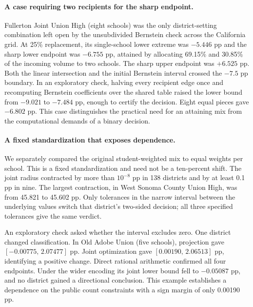 \documentclass[11pt]{article}
\begin{document}
\paragraph{A case requiring two recipients for the sharp endpoint.}
Fullerton Joint Union High (eight schools) was the only district-setting combination left open by the unsubdivided Bernstein check across the California grid. At 25\% replacement, its single-school lower extreme was $-5.446$ pp and the sharp lower endpoint was $-6.755$ pp, attained by allocating 69.15\% and 30.85\% of the incoming volume to two schools. The sharp upper endpoint was $+6.525$ pp. Both the linear intersection and the initial Bernstein interval crossed the $-7.5$ pp boundary. In an exploratory check, halving every recipient edge once and recomputing Bernstein coefficients over the shared table raised the lower bound from $-9.021$ to $-7.484$ pp, enough to certify the decision. Eight equal pieces gave $-6.802$ pp. This case distinguishes the practical need for an attaining mix from the computational demands of a binary decision.

\paragraph{A fixed standardization that exposes dependence.}
We separately compared the original student-weighted mix to equal weights per school. This is a fixed standardization and need not be a ten-percent shift. The joint radius contracted by more than $10^{-8}$ pp in 138 districts and by at least 0.1 pp in nine. The largest contraction, in West Sonoma County Union High, was from 45.821 to 45.602 pp. Only tolerances in the narrow interval between the underlying values switch that district's two-sided decision; all three specified tolerances give the same verdict.

An exploratory check asked whether the interval excludes zero. One district changed classification. In Old Adobe Union (five schools), projection gave $[-0.00775,\,2.07477]$ pp. Joint optimization gave $[0.00190,\,2.06513]$ pp, identifying a positive change. Direct rational arithmetic confirmed all four endpoints. Under the wider encoding its joint lower bound fell to $-0.05087$ pp, and no district gained a directional conclusion. This example establishes a dependence on the public count constraints with a sign margin of only 0.00190 pp.
\end{document}
